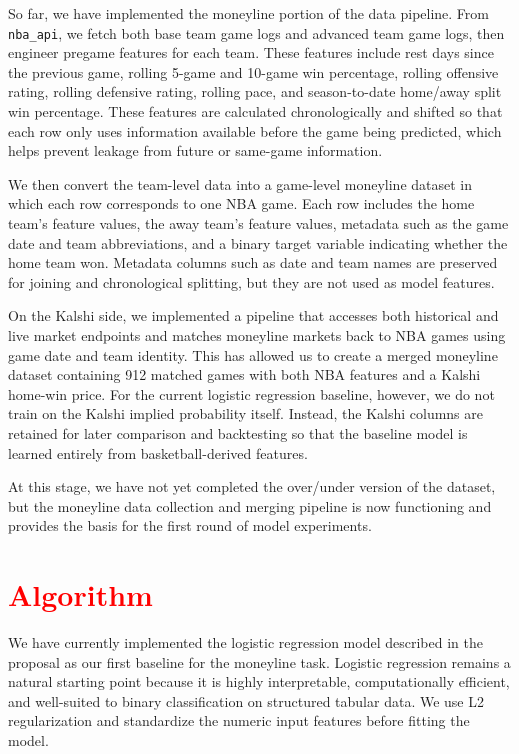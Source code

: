 \documentclass[sigconf]{acmart}
\begin{document}
So far, we have implemented the moneyline portion of the data pipeline. From \texttt{nba\_api}, we fetch both base team game logs and advanced team game logs, then engineer pregame features for each team. These features include rest days since the previous game, rolling 5-game and 10-game win percentage, rolling offensive rating, rolling defensive rating, rolling pace, and season-to-date home/away split win percentage. These features are calculated chronologically and shifted so that each row only uses information available before the game being predicted, which helps prevent leakage from future or same-game information.

We then convert the team-level data into a game-level moneyline dataset in which each row corresponds to one NBA game. Each row includes the home team's feature values, the away team's feature values, metadata such as the game date and team abbreviations, and a binary target variable indicating whether the home team won. Metadata columns such as date and team names are preserved for joining and chronological splitting, but they are not used as model features.

On the Kalshi side, we implemented a pipeline that accesses both historical and live market endpoints and matches moneyline markets back to NBA games using game date and team identity. This has allowed us to create a merged moneyline dataset containing 912 matched games with both NBA features and a Kalshi home-win price. For the current logistic regression baseline, however, we do not train on the Kalshi implied probability itself. Instead, the Kalshi columns are retained for later comparison and backtesting so that the baseline model is learned entirely from basketball-derived features.

At this stage, we have not yet completed the over/under version of the dataset, but the moneyline data collection and merging pipeline is now functioning and provides the basis for the first round of model experiments.

\section{\textcolor{red}{Algorithm}}
We have currently implemented the logistic regression model described in the proposal as our first baseline for the moneyline task. Logistic regression remains a natural starting point because it is highly interpretable, computationally efficient, and well-suited to binary classification on structured tabular data. We use L2 regularization and standardize the numeric input features before fitting the model.
\end{document}
